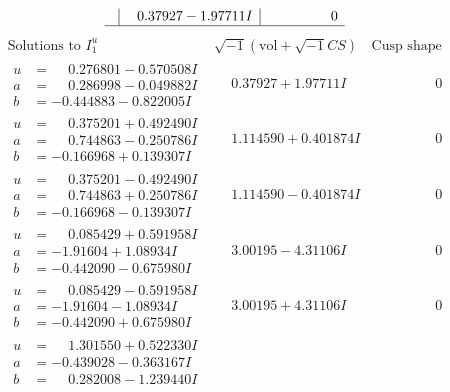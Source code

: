 \documentclass[1p]{elsarticle_modified}
\theoremstyle{definition}
\newcommand{\I}{\sqrt{-1}}
\begin{document}
$$\begin{array}{c|c|c}
 & \phantom{-}0.37927 - 1.97711 I & \phantom{-0.000000 } 0\\
 \hline 
 \end{array}$$\newpage$$\begin{array}{c|c|c}  
\text{Solutions to }I^u_{1}& \I (\text{vol} + \sqrt{-1}CS) & \text{Cusp shape}\\
 \hline 
\begin{aligned}
u &= \phantom{-}0.276801 - 0.570508 I \\
a &= \phantom{-}0.286998 - 0.049882 I \\
b &= -0.444883 - 0.822005 I\end{aligned}
 & \phantom{-}0.37927 + 1.97711 I & \phantom{-0.000000 } 0 \\ \hline\begin{aligned}
u &= \phantom{-}0.375201 + 0.492490 I \\
a &= \phantom{-}0.744863 - 0.250786 I \\
b &= -0.166968 + 0.139307 I\end{aligned}
 & \phantom{-}1.114590 + 0.401874 I & \phantom{-0.000000 } 0 \\ \hline\begin{aligned}
u &= \phantom{-}0.375201 - 0.492490 I \\
a &= \phantom{-}0.744863 + 0.250786 I \\
b &= -0.166968 - 0.139307 I\end{aligned}
 & \phantom{-}1.114590 - 0.401874 I & \phantom{-0.000000 } 0 \\ \hline\begin{aligned}
u &= \phantom{-}0.085429 + 0.591958 I \\
a &= -1.91604 + 1.08934 I \\
b &= -0.442090 - 0.675980 I\end{aligned}
 & \phantom{-}3.00195 - 4.31106 I & \phantom{-0.000000 } 0 \\ \hline\begin{aligned}
u &= \phantom{-}0.085429 - 0.591958 I \\
a &= -1.91604 - 1.08934 I \\
b &= -0.442090 + 0.675980 I\end{aligned}
 & \phantom{-}3.00195 + 4.31106 I & \phantom{-0.000000 } 0 \\ \hline\begin{aligned}
u &= \phantom{-}1.301550 + 0.522330 I \\
a &= -0.439028 - 0.363167 I \\
b &= \phantom{-}0.282008 - 1.239440 I\end{aligned}

\end{array}$$
\end{document}
